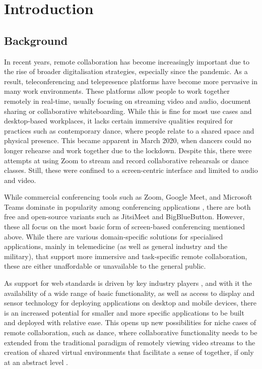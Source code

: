 \chapter{Introduction}
\label{chapter:introduction}

\section{Background}

In recent years, remote collaboration has become increasingly important due to the rise of broader digitalisation strategies, especially since the pandemic. As a result, teleconferencing and telepresence platforms have become more pervasive in many work environments. These platforms allow people to work together remotely in real-time, usually focusing on streaming video and audio, document sharing or collaborative whiteboarding. While this is fine for most use cases and desktop-based workplaces, it lacks certain immersive qualities required for practices such as contemporary dance, where people relate to a shared space and physical presence. This became apparent in March 2020, when dancers could no longer rehearse and work together due to the lockdown. Despite this, there were attempts at using Zoom to stream and record collaborative rehearsals or dance classes. Still, these were confined to a screen-centric interface and limited to audio and video.

While commercial conferencing tools such as Zoom, Google Meet, and Microsoft Teams dominate in popularity among conferencing applications \parencite{mostPopularConferencingPlatforms}, there are both free and open-source variants such as JitsiMeet and BigBlueButton. However, these all focus on the most basic form of screen-based conferencing mentioned above. While there are various domain-specific solutions for specialised applications, mainly in telemedicine (as well as general industry and the military), that support more immersive and task-specific remote collaboration, these are either unaffordable or unavailable to the general public.

As support for web standards is driven by key industry players \parencite{pushingInteroperabilityForward}, and with it the availability of a wide range of basic functionality, as well as access to display and sensor technology for deploying applications on desktop and mobile devices, there is an increased potential for smaller and more specific applications to be built and deployed with relative ease. This opens up new possibilities for niche cases of remote collaboration, such as dance, where collaborative functionality needs to be extended from the traditional paradigm of remotely viewing video streams to the creation of shared virtual environments that facilitate a sense of  together, if only at an abstract level \parencite{surveyOfPresence}.

